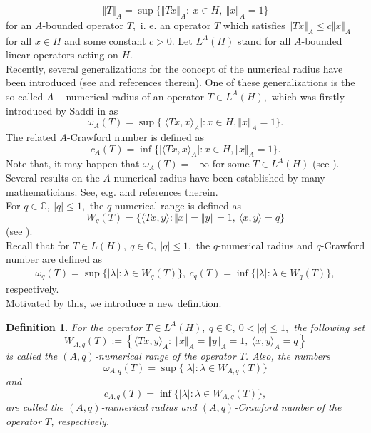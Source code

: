 \documentclass[preprint,12pt,3p]{elsarticle}
\newtheorem{definition}{Definition}
\begin{document}
$$
\Vert T \Vert_{A}=\sup \lbrace \Vert Tx \Vert_{A}: \ x\in H, \ \Vert x \Vert_{A}=1 \rbrace 
$$
for an $ A $-bounded operator $ T, $ i. e. an operator $ T $ which satisfies $ \Vert Tx \Vert_{A}\leq c \Vert x \Vert_{A} $ for all $ x\in H $ and some constant $ c>0. $ Let $ L^{A}(H) $ stand for all  $ A$-bounded linear operators acting on $ H. $ \\
Recently, several generalizations for the concept of the numerical radius have been introduced (see \cite{sheybani} and references therein).  One of these generalizations is the so-called $ A- $numerical radius of an operator $ T\in L^{A}(H), $ which was firstly introduced by Saddi in \cite{saddi} as 
$$
\omega _{A}(T)=\sup \lbrace \vert \langle Tx, x\rangle_{A} \vert :x\in H, \Vert x \Vert_{A}=1 \rbrace.
$$
The related $ A $-Crawford number is defined as
$$
c _{A}(T)=\inf \lbrace \vert \langle Tx, x\rangle_{A} \vert :x\in H, \Vert x \Vert_{A}=1 \rbrace.
$$
Note that, it may happen that $ \omega_{A}(T)=+\infty  $ for some $ T\in L^{A}(H) $ (see \cite{baklouti}). Several results on the $ A$-numerical  radius have been established by many mathematicians. See, e.g. \cite{bhunia5, bhunia6, conde, FS, KITSAT, MMJ, PR, NSD, Nirmal2, SS, Zam} and references therein. \\
For $ q\in \mathbb{C}, \ \vert q \vert \leq 1, $ the $ q $-numerical range is defined as
$$
W_{q}(T)=\lbrace \langle Tx,y\rangle : \Vert x \Vert = \Vert y \Vert =1, \ \langle x,y \rangle =q \rbrace 
$$
(see \cite{li, marcus, rajic, stampfli}). \\
Recall that for $ T\in L(H), \  q\in \mathbb{C}, \ \vert q \vert \leq 1,  $ the $ q$-numerical radius and $ q$-Crawford number are defined as
\begin{eqnarray}
\omega_{q}(T)=\sup\lbrace \vert \lambda \vert: \lambda \in W_{q}(T) \rbrace , \ c_{q}(T)=\inf\lbrace \vert \lambda \vert: \lambda \in W_{q}(T) \rbrace , \nonumber
\end{eqnarray}
respectively. \\
Motivated by this, we introduce a new definition. 
\begin{definition}
For the operator $ T\in L^{A}(H), \ q\in \mathbb{C}, \ 0< \vert q \vert \leq 1, $ the following set
$$
W_{A,q}(T):= \left\lbrace \langle Tx,y \rangle_{A}: \ \Vert x \Vert_{A}= \Vert y \Vert_{A}=1, \ \langle x,y\rangle_{A}=q \right\rbrace 
$$
is called the $ (A,q)$-numerical range of the operator $ T $. Also, the numbers
$$
\omega _{A,q}(T)=\sup \lbrace \vert \lambda \vert : \lambda \in W_{A,q}(T) \rbrace
$$
and
$$
c_{A,q}(T)=\inf \lbrace \vert \lambda \vert : \lambda \in W_{A,q}(T) \rbrace,
$$
are called the $ (A,q)$-numerical radius and $ (A,q) $-Crawford number of the operator $ T $, respectively. \\
\end{definition}
\end{document}
